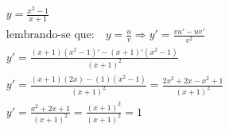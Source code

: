 \begin{ex}
\begin{align}
&y=\frac{x^2-1}{x+1}\nonumber\\
&\text{lembrando-se que:}\quad y=\frac{u}{v} \Rightarrow y'=\frac{vu'-uv'}{v^2}\nonumber\\
&y'=\frac{(x+1)(x^2-1)'-(x+1)'(x^2-1)}{(x+1)^2}\nonumber\\
&y'=\frac{(x+1)(2x)-(1)(x^2-1)}{(x+1)^2}=\frac{2x^2+2x-x^2+1}{(x+1)^2}\nonumber\\
&y'=\frac{x^2+2x+1}{(x+1)^2}=\frac{(x+1)^2}{(x+1)^2}=1\nonumber
\end{align}
\end{ex}